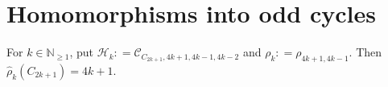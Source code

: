 \documentclass[12pt]{amsart}
\theoremstyle{plain}
\newtheorem{lem}[thm]{Lemma}
\theoremstyle{definition}
\theoremstyle{remark}
\newcommand{\fancy}[1]{\mathcal{#1}}
\newcommand{\C}{\fancy{C}}
\newcommand{\IN}{\mathbb{N}}
\renewcommand{\H}{\fancy{H}}
\newcommand{\inj}{\hookrightarrow}
\newcommand{\set}[1]{\left\{ #1 \right\}}
\newcommand{\card}[1]{\left|#1\right|}
\newcommand{\DefinedAs}{\mathrel{\mathop:}=}
\begin{document}
%


\section{Homomorphisms into odd cycles}
For $k \in \IN_{\ge 1}$, put $\H_k \DefinedAs \C_{C_{2k+1}, 4k+1, 4k-1, 4k-2}$ and $\rho_k \DefinedAs \rho_{4k+1, 4k-1}$.  Then $\hat{\rho}_k(C_{2k+1}) = 4k+1$.



\end{document}
